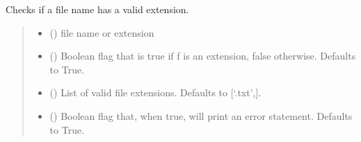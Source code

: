 \documentclass[letterpaper,10pt,english]{sphinxmanual}
\begin{document}
\begin{fulllineitems}
\begin{fulllineitems}
\label{\detokenize{GetUserInput:GetUserInput.UserInput.CheckFileExt}}
\pysigstartsignatures
{}
\pysigstopsignatures
\sphinxAtStartPar
Checks if a file name has a valid extension.
\begin{quote}\begin{description}
\begin{itemize}
\item {} 
\sphinxAtStartPar
{} () \textendash{} file name or extension

\item {} 
\sphinxAtStartPar
{} (\sphinxstyleliteralemphasis{\sphinxupquote{, }}) \textendash{} Boolean flag that is true if f is an extension, false                 otherwise. Defaults to True.

\item {} 
\sphinxAtStartPar
{} (\sphinxstyleliteralemphasis{\sphinxupquote{{[}}}\sphinxstyleliteralemphasis{\sphinxupquote{{]}}}\sphinxstyleliteralemphasis{\sphinxupquote{, }}) \textendash{} List of valid file extensions. Defaults to                 {[}‘.txt’,{]}.

\item {} 
\sphinxAtStartPar
{} (\sphinxstyleliteralemphasis{\sphinxupquote{, }}) \textendash{} Boolean flag that, when true, will print an error                 statement. Defaults to True.


\end{itemize}
\end{description}
\end{quote}
\end{fulllineitems}
\end{fulllineitems}
\end{document}
